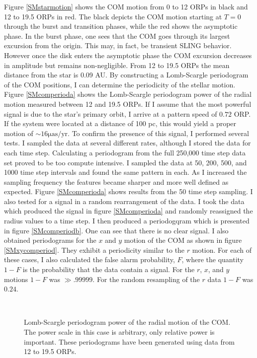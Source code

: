 Figure \ref{SMstarmotion} shows the COM motion from 0 to 12 ORPs in black and 12 to 19.5 ORPs in red. The black depicts the COM motion starting at $T=0$ through the burst and transition phases, while the red shows the asymptotic phase. In the burst phase, one sees that the COM goes through its largest excursion from the origin. This may, in fact, be transient SLING behavior. However once the disk enters the asymptotic phase the COM excursion decreases in amplitude but remains non-negligible. From 12 to 19.5 ORPs the mean distance from the star is 0.09 AU. By constructing a Lomb-Scargle periodogram \citep{lomb1975,scargle1982} of the COM positions, I can determine the periodicity of the stellar motion. Figure \ref{SMcomperioda} shows the Lomb-Scargle periodogram power of the radial motion measured between 12 and 19.5 ORPs. If I assume that the most powerful signal is due to the star's primary orbit, I arrive at a pattern speed of $0.72$ ORP. If the system were located at a distance of 100 pc, this would yield a proper motion of $\sim 16 \mathrm{\mu as/yr}$. To confirm the presence of this signal, I performed several tests. I sampled the data at several different rates, although I stored the data for each time step. Calculating a periodogram from the full 250,000 time step data set proved to be too compute intensive. I sampled the data at 50, 200, 500, and 1000 time step intervals and found the same pattern in each. As I increased the sampling frequency the features became sharper and more well defined as expected. Figure \ref{SMcomperioda} shows results from the 50 time step sampling. I also tested for a signal in a random rearrangement of the data. I took the data which produced the signal in figure \ref{SMcomperioda} and randomly reassigned the radius values to a time step. I then produced a periodogqram which is presented in figure \ref{SMcomperiodb}. One can see that there is no clear signal. I also obtained periodograms for the $x$ and $y$ motion of the COM as shown in figure \ref{SMxycomperiod}. They exhibit a periodicity similar to the $r$ motion. For each of these cases, I also calculated the false alarm probability, $F$, \citep{horne1986} where the quantity $1-F$ is the probability that the data contain a signal. For the $r$, $x$, and $y$ motions $1-F$ was $\gg .99999$. For the random resampling of the $r$ data $1-F$ was $0.24$. 
\begin{figure}[p]
\centering
{}
\\
\caption[COM periodogram for radius and random sample]{Lomb-Scargle periodogram power of the radial motion of the COM. The power scale in this case is arbitrary, only relative power is important. These periodograms have been generated using data from 12 to 19.5 ORPs.}
\end{figure}

